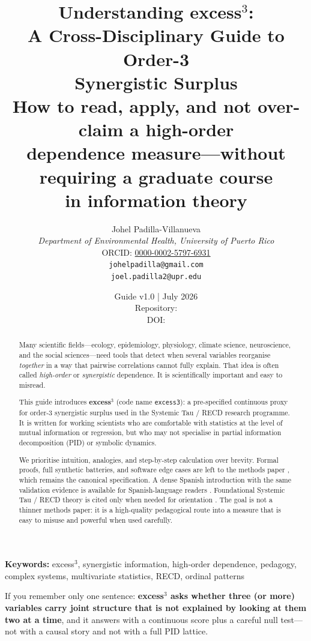 \documentclass[11pt,a4paper]{article}
\title{\textbf{Understanding excess$^3$:}\\[0.35em]
A Cross-Disciplinary Guide to Order-3\\
Synergistic Surplus\\[0.55em]
\large How to read, apply, and not over-claim a high-order\\
dependence measure---without requiring a graduate course\\
in information theory}
\author{
Johel Padilla-Villanueva \\
\textit{Department of Environmental Health, University of Puerto Rico} \\
ORCID: \href{https://orcid.org/0000-0002-5797-6931}{0000-0002-5797-6931} \\
\texttt{johelpadilla@gmail.com} \\
\texttt{joel.padilla2@upr.edu}
}
\date{Guide v1.0 \quad | \quad July 2026 \\[0.25em]\small Repository: \href{\ExcessThreeRepo}{\ExcessThreeRepoShort}\\[0.15em]\small DOI: \href{\ExcessThreeDOIURL}{\ExcessThreeDOI}}
\begin{document}
\maketitle

\begin{abstract}
\noindent
Many scientific fields---ecology, epidemiology, physiology, climate science,
neuroscience, and the social sciences---need tools that detect when several
variables reorganise \emph{together} in a way that pairwise correlations
cannot fully explain. That idea is often called \emph{high-order} or
\emph{synergistic} dependence. It is scientifically important and easy to
misread.

This guide introduces \textbf{excess$^3$} (code name \texttt{excess3}): a
pre-specified continuous proxy for order-3 synergistic surplus used in the
Systemic Tau / RECD research programme. It is written for working scientists
who are comfortable with statistics at the level of mutual information or
regression, but who may not specialise in partial information decomposition
(PID) or symbolic dynamics.

We prioritise intuition, analogies, and step-by-step calculation over
brevity. Formal proofs, full synthetic batteries, and software edge cases are
left to the methods paper \citep{Padilla2026excess3}, which remains the
canonical specification. A dense Spanish introduction with the same
validation evidence is available for Spanish-language readers
\citep{Padilla2026intro}. Foundational Systemic Tau / RECD theory is cited
only when needed for orientation \citep{Padilla2026framework}. The goal is
not a thinner methods paper: it is a high-quality pedagogical route into a
measure that is easy to misuse and powerful when used carefully.
\end{abstract}

\noindent\textbf{Keywords:}
excess$^3$, synergistic information, high-order dependence, pedagogy,
complex systems, multivariate statistics, RECD, ordinal patterns

\vspace{0.35cm}

\begin{keyidea}
If you remember only one sentence: \textbf{excess$^3$ asks whether three (or
more) variables carry joint structure that is not explained by looking at
them two at a time}, and it answers with a continuous score plus a careful
null test---not with a causal story and not with a full PID lattice.
\end{keyidea}
\end{document}
